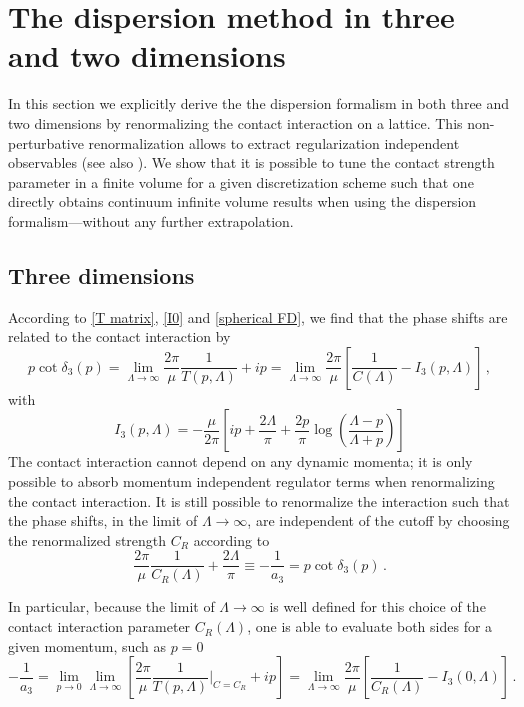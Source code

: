 \section{The dispersion method in three and two dimensions}\label{sec:3D dispersion}
In this section we explicitly derive the the dispersion formalism in both three and two dimensions by renormalizing the contact interaction on a lattice.
This non-perturbative renormalization allows to extract regularization independent observables (see also \cite{Epelbaum:2018zli}).
We show that it is possible to tune the contact strength parameter in a finite volume for a given discretization scheme such that one directly obtains continuum infinite volume results when using the dispersion formalism---without any further extrapolation.

\subsection{Three dimensions}

According to \eqref{T matrix}, \eqref{I0} and \eqref{spherical FD}, we find that the phase shifts are related to the contact interaction by
\begin{equation}\label{eq:blah blah}
	p \cot \delta_3(p)
	= \lim\limits_{\Lambda \to \infty}\frac{2 \pi}{\mu}\frac{1}{T(p, \Lambda)} + i p
	= \lim\limits_{\Lambda \to \infty}
		\frac{2 \pi}{\mu} \left[
			\frac{1}{C(\Lambda)} - I_3(p, \Lambda)
		\right]
	\, ,
\end{equation}
with
\begin{equation}
	I_3(p, \Lambda)
	=
	-\frac{\mu}{2 \pi}
	\left[
	i p + \frac{2 \Lambda}{\pi} + \frac{2  p}{\pi} \log \left( \frac{\Lambda - p}{\Lambda + p}\right)
	\right]
\end{equation}
The contact interaction cannot depend on any dynamic momenta; it is only possible to absorb momentum independent regulator terms when renormalizing the contact interaction.
It is still possible to renormalize the interaction such that the phase shifts, in the limit of $\Lambda \to \infty$, are independent of the cutoff by choosing the renormalized strength $C_R$ according to
\begin{equation}\label{eq:three-d-counterterm}
	\frac{2 \pi}{\mu} \frac{1}{C_R(\Lambda)} + \frac{2 \Lambda}{\pi}
	\equiv
	- \frac{1}{a_3}
	=
	p \cot \delta_3(p)
	\, .
\end{equation}

In particular, because the limit of $\Lambda \to \infty$ is well defined for this choice of the contact interaction parameter $C_R(\Lambda)$, one is able to evaluate both sides for a given momentum, such as $p=0$
\begin{equation}
	- \frac{1}{a_3}
	=
	\lim\limits_{p \to 0}\lim\limits_{\Lambda \to \infty}
		\left[
			\frac{2 \pi}{\mu}\frac{1}{T(p, \Lambda)} \bigg|_{C=C_R} + i p
	\right]
	=
	\lim\limits_{\Lambda \to \infty}
	\frac{2 \pi}{\mu}
		\left[
		\frac{1}{C_R(\Lambda)} - I_3(0, \Lambda)
		\right]
	\, .
\end{equation}

